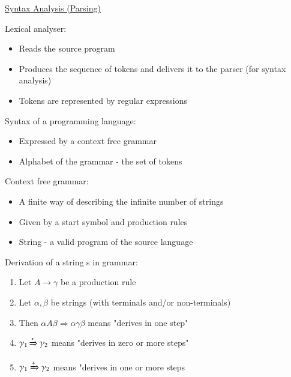 \documentclass{article}[18pt]
\begin{document}
\begin{center}
\underline{\huge Syntax Analysis (Parsing)}
\end{center}
Lexical analyser:
\begin{itemize}
	\item Reads the source program
	\item Produces the sequence of tokens and delivers it to the parser (for syntax analysis)
	\item Tokens are represented by regular expressions
\end{itemize}
Syntax of a programming language:
\begin{itemize}
	\item Expressed by a context free grammar
	\item Alphabet of the grammar - the set of tokens
\end{itemize}
Context free grammar:
\begin{itemize}
	\item A finite way of describing the infinite number of strings
	\item Given by a start symbol and production rules
	\item String - a valid program of the source language
\end{itemize}
Derivation of a string s in grammar:
\begin{enumerate}
	\item Let $A\rightarrow \gamma$ be a production rule
	\item Let $\alpha, \beta$ be strings (with terminals and/or non-terminals)
	\item Then $\alpha A \beta \Rightarrow \alpha \gamma \beta$ means "derives in one step"
	\item $\gamma_1\xRightarrow{*}\gamma_2$ means "derives in zero or more steps"
	\item $\gamma_1\xRightarrow{+}\gamma_2$ means "derives in one or more steps
\end{enumerate}
\end{document}
